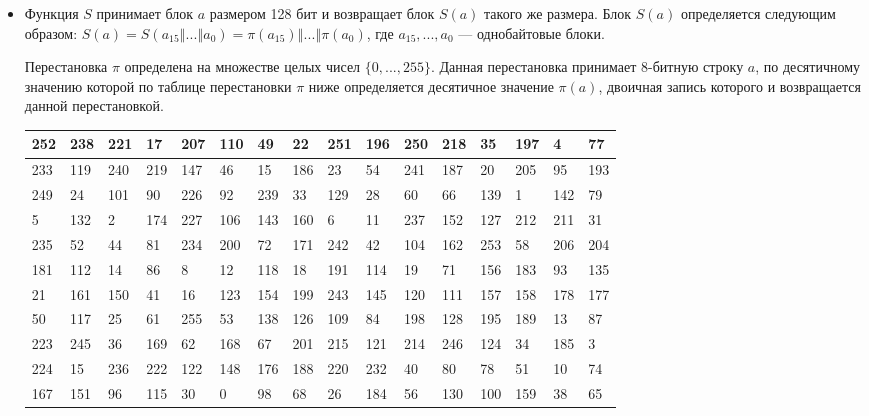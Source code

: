 \documentclass{./civarticle}
\begin{document}
\begin{itemize}

    \item Функция $S$ принимает блок $a$ размером 128 бит и возвращает блок $S(a)$ такого же размера. Блок $S(a)$ определяется следующим образом: $S(a) = S(a_{15}\mathbin\Vert ... \mathbin\Vert a_0) = \pi(a_{15}) \mathbin\Vert ... \mathbin\Vert \pi(a_0)$, где $a_{15}, ..., a_0$ --- однобайтовые блоки.

    Перестановка $\pi$ определена на множестве целых чисел $\{ 0, ..., 255\}$. Данная перестановка принимает 8-битную строку $a$, по десятичному значению которой по таблице перестановки $\pi$ ниже определяется десятичное значение $\pi(a)$, двоичная запись которого и возвращается данной перестановкой.

    \begin{longtable}{|p{0.5cm}|p{0.5cm}|p{0.5cm}|p{0.5cm}|p{0.5cm}|p{0.5cm}|p{0.5cm}|p{0.5cm}|p{0.5cm}|p{0.5cm}|p{0.5cm}|p{0.5cm}|p{0.5cm}|p{0.5cm}|p{0.5cm}|p{0.5cm}|}
    \hline
    252 & 238 & 221 & 17 & 207 & 110 & 49 & 22 & 251 & 196 & 250 & 218 & 35 & 197 & 4 & 77 \\ 
    \hline
    233 & 119 & 240 & 219 & 147 & 46 & 15 & 186 & 23 & 54 & 241 & 187 & 20 & 205 & 95 & 193 \\
    \hline
    249 & 24 & 101 & 90 & 226 & 92 & 239 & 33 & 129 & 28 & 60 & 66 & 139 & 1 & 142 & 79 \\ 
    \hline
    5 & 132 & 2 & 174 & 227 & 106 & 143 & 160 & 6 & 11 & 237 & 152 & 127 & 212 & 211 & 31 \\
    \hline
    235 & 52 & 44 & 81 & 234 & 200 & 72 & 171 & 242 & 42 & 104 & 162 & 253 & 58 & 206 & 204 \\ 
    \hline
    181 & 112 & 14 & 86 & 8 & 12 & 118 & 18 & 191 & 114 & 19 & 71 & 156 & 183 & 93 & 135 \\
    \hline
    21 & 161 & 150 & 41 & 16 & 123 & 154 & 199 & 243 & 145 & 120 & 111 & 157 & 158 & 178 & 177 \\
    \hline
    50 & 117 & 25 & 61 & 255 & 53 & 138 & 126 & 109 & 84 & 198 & 128 & 195 & 189 & 13 & 87 \\
    \hline
    223 & 245 & 36 & 169 & 62 & 168 & 67 & 201 & 215 & 121 & 214 & 246 & 124 & 34 & 185 & 3 \\
    \hline
    224 & 15 & 236 & 222 & 122 & 148 & 176 & 188 & 220 & 232 & 40 & 80 & 78 & 51 & 10 & 74 \\
    \hline
    167 & 151 & 96 & 115 & 30 & 0 & 98 & 68 & 26 & 184 & 56 & 130 & 100 & 159 & 38 & 65 \\

\end{longtable}
\end{itemize}
\end{document}

